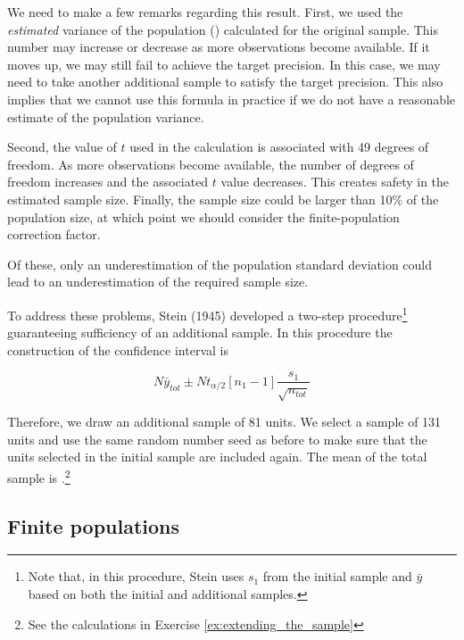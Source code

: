 

We need to make a few remarks regarding this result. First, we used the \emph{estimated} variance of the population (\EstMeanSampleVariance) calculated for the original sample. This number may increase or decrease as more observations become available. If it moves up, we may still fail to achieve the target precision. In this case, we may need to take another additional sample to satisfy the target precision. This also implies that we cannot use this formula in practice if we do not have a reasonable estimate of the population variance. 

Second, the value of $t$ used in the calculation is associated with 49 degrees of freedom. As more observations become available, the number of degrees of freedom increases and the associated $t$ value decreases. This creates safety in the estimated sample size. Finally, the sample size could be larger than 10\% of the population size, at which point we should consider the finite-population correction factor.

Of these, only an underestimation of the population standard deviation could lead to an underestimation of the required sample size. 

To address these problems, Stein (1945) developed a two-step procedure\footnote{Note that, in this procedure, Stein uses $s_1$ from the initial sample and $\bar{y}$ based on both the initial and additional samples.} guaranteeing sufficiency of an additional sample. In this procedure the construction of the confidence interval is

\begin{equation}
  N \bar{y}_{tot} \pm N t_{\alpha/2}[n_1-1] \frac{s_1}{\sqrt{n_{tot}}}
  \label{eq:stein}
\end{equation}

Therefore, we draw an additional sample of 81 units. We select a sample of 131 units and use the same random number seed as before to make sure that the units selected in the initial sample are included again.
The mean of the total sample is \EstMeanSampleTwoMean.\footnote{See the calculations in Exercise \ref{ex:extending_the_sample}}




\subsection{Finite populations} %
\label{sub:finite_populations}


